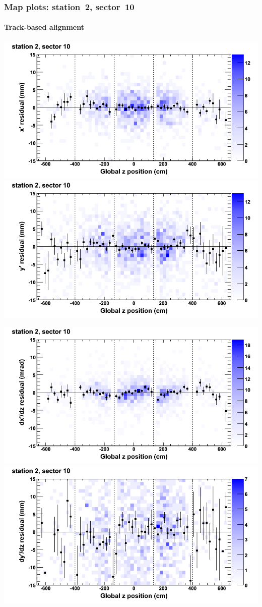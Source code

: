 \documentclass[compress]{beamer}
\begin{document}
\begin{frame}
\frametitle{Map plots: station~2, sector~10}
\framesubtitle{Track-based alignment}
\includegraphics[width=0.5\linewidth]{mapplots_re05/DTvsz_st2sec10_x.png}
\includegraphics[width=0.5\linewidth]{mapplots_re05/DTvsz_st2sec10_y.png}

\includegraphics[width=0.5\linewidth]{mapplots_re05/DTvsz_st2sec10_dxdz.png}
\includegraphics[width=0.5\linewidth]{mapplots_re05/DTvsz_st2sec10_dydz.png}
\end{frame}
\end{document}
